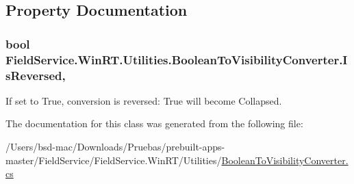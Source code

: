 \subsection{Property Documentation}
\hypertarget{class_field_service_1_1_win_r_t_1_1_utilities_1_1_boolean_to_visibility_converter_abfc5b01c9ba3db01a6aa7cfa6831e678}{
\subsubsection[{Is\+Reversed}]{\setlength{\rightskip}{0pt plus 5cm}bool Field\+Service.\+Win\+R\+T.\+Utilities.\+Boolean\+To\+Visibility\+Converter.\+Is\+Reversed\hspace{0.3cm}{\ttfamily [get]}, {\ttfamily [set]}}}\label{class_field_service_1_1_win_r_t_1_1_utilities_1_1_boolean_to_visibility_converter_abfc5b01c9ba3db01a6aa7cfa6831e678}


If set to True, conversion is reversed\+: True will become Collapsed. 



The documentation for this class was generated from the following file\+:\begin{DoxyCompactItemize}
\item 
/\+Users/bsd-\/mac/\+Downloads/\+Pruebas/prebuilt-\/apps-\/master/\+Field\+Service/\+Field\+Service.\+Win\+R\+T/\+Utilities/\hyperlink{_boolean_to_visibility_converter_8cs}{Boolean\+To\+Visibility\+Converter.\+cs}\end{DoxyCompactItemize}
